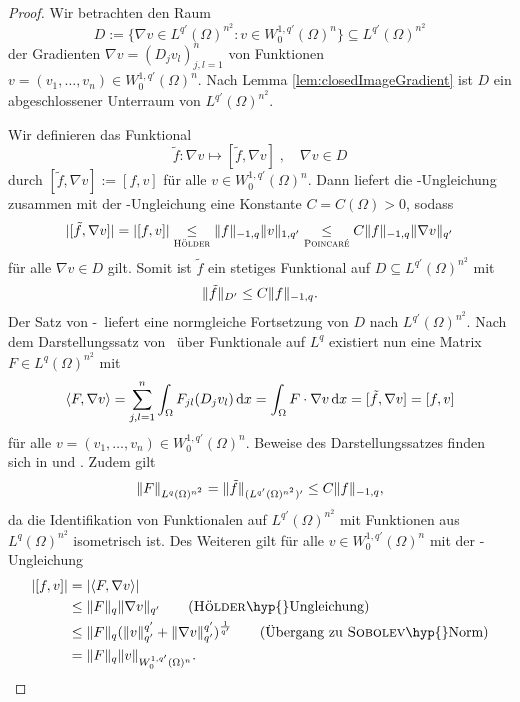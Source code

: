 \begin{proof}
  Wir betrachten den Raum
  $$
  D := \{\nabla v \in L^{q'}(\Omega)^{n^2} \colon v \in W_0^{1,q'}(\Omega)^n\} \subseteq L^{q'}(\Omega)^{n^2}
  $$
  der Gradienten $\nabla v = (D_j v_l)_{j,l=1}^n$ von Funktionen $v = (v_1,\dots,v_n) \in W_0^{1,q'}(\Omega)^n$.
  Nach Lemma \ref{lem:closedImageGradient} ist $D$ ein abgeschlossener Unterraum von $L^{q'}(\Omega)^{n^2}$.

  Wir definieren das Funktional
  $$
  \tilde f \colon \nabla v \mapsto [\tilde f, \nabla v]\;, \quad \nabla v \in D
  $$
  durch $[\tilde f, \nabla v] := [f, v]$ für alle $v \in W_0^{1,q'}(\Omega)^n$.
  Dann liefert die \hoelder\hyp{}Ungleichung zusammen mit der \poincare\hyp{}Ungleichung eine Konstante $C = C(\Omega) > 0$, sodass 
  $$
  |[\tilde f, \nabla v]| 
  = |[f, v]| 
  \underset{\hoelder}{\leq} \norm{f}_{-1,q} \norm{v}_{1,q'}
  \underset{\poincare}{\leq} C \norm{f}_{-1,q} \norm{\nabla v }_{q'}
  $$
  für alle $\nabla v \in D$ gilt.
  Somit ist $\tilde f$ ein stetiges Funktional auf $D \subseteq L^{q'}(\Omega)^{n^2}$ mit 
  $$\norm{\tilde f}_{D'} \leq C\norm{f}_{-1,q}.$$
  Der Satz von \hahn\hyp{}\banach\ liefert eine normgleiche Fortsetzung von $D$ nach $L^{q'}(\Omega)^{n^2}$.
  Nach dem Darstellungssatz von \riesz\ über Funktionale auf $L^{q}$  existiert nun eine Matrix $F \in L^{q}(\Omega)^{n^2}$ mit
  $$
  \langle F, \nabla v \rangle
  = \sum_{j,l=1}^n \int_\Omega F_{jl}(D_j v_l) \d x
  = \int_\Omega F \cdot \nabla v \d x
  = [\tilde f, \nabla v] 
  = [f, v]
  $$
  für alle $v = (v_1,\dots,v_n) \in W_0^{1,q'}(\Omega)^n$.
  Beweise des Darstellungssatzes finden sich in \cite[S.47, Theorem 2.44]{adams2003sobolev} und \cite[S.60, Satz II.2.4]{werner2011fa}.
  Zudem gilt
  $$ \norm{F}_{L^q(\Omega)^{n^2}} = \norm{\tilde f}_{(L^{q'}(\Omega)^{n^2})'} \leq C \norm{f}_{-1,q},$$
  da die Identifikation von Funktionalen auf $L^{q'}(\Omega)^{n^2}$ mit Funktionen aus $L^q(\Omega)^{n^2}$ isometrisch ist.
  Des Weiteren gilt für alle $v \in W_0^{1,q'}(\Omega)^n$ mit der \hoelder\hyp{}Ungleichung
  \begin{align*}
    |[f,v]| 
    &= |\langle F, \nabla v\rangle|  \\
    &\leq \norm{F}_q \norm{\nabla v}_{q'}  \tag{\hoelder\hyp{}Ungleichung}\\
    &\leq \norm{F}_q (\norm{v}_{q'}^{q'} + \norm{\nabla v}_{q'}^{q'})^{\frac{1}{q'}} \tag{Übergang zu \sobolev\hyp{}Norm}\\
    &= \norm{F}_q \norm{v}_{W_0^{1,q'}(\Omega)^n}.
  \end{align*}

\end{proof}
